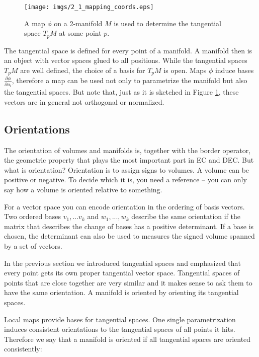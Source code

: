 \begin{figure}[tb]
\begin{center}
\texttt{[image: imgs/2\_1\_mapping\_coords.eps]}
\end{center}
\caption{A map $\phi$ on a 2-manifold $M$ is used to determine the tangential space $T_{p}M$ at some point $p$.}
\label{fig::2_1_mapping_coords}
\end{figure}

The tangential space is defined for every point of a manifold. A manifold then is an object with vector spaces glued to all positions. While the tangential spaces $T_pM$  are well defined, the choice of a basis for $T_pM$ is open. Maps $\phi$ induce bases $\frac{\partial \phi}{\partial u_i}$, therefore a map can be used not only to parametrize the manifold but also the tangential spaces. But note that, just as it is sketched in Figure \ref{fig::2_1_mapping_coords}, these vectors are in general not orthogonal or normalized. 

\subsection{Orientations}

The orientation of volumes and manifolds is, together with the border operator, the geometric property that plays the most important part in EC and DEC. But what is orientation? Orientation is to assign signs to volumes. A volume can be positive or negative. To decide which it is, you need a reference -- you can only say how a volume is oriented relative to something.

For a vector space you can encode orientation in the ordering of basis vectors. Two ordered bases $v_1,...v_k$ and $w_1,...,w_k$ describe the same orientation if the matrix that describes the change of bases has a positive determinant. If a base is chosen, the determinant can also be used to measures the signed volume spanned by a set of vectors.

In the previous section we introduced tangential spaces and emphasized that every point gets its own proper tangential vector space. Tangential spaces of points that are close together are very similar and it makes sense to ask them to have the same orientation. A manifold is oriented by orienting its tangential spaces.

Local maps provide bases for tangential spaces. One single parametrization induces consistent orientations to the tangential spaces of all points it hits. Therefore we say that a manifold is oriented if all tangential spaces are oriented consistently:

